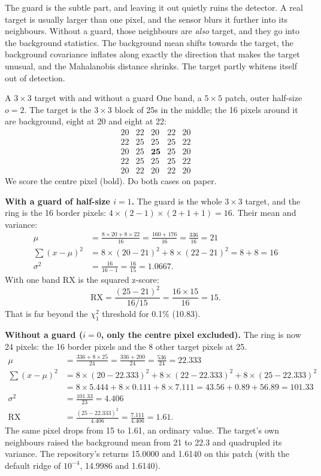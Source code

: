The guard is the subtle part, and leaving it out quietly ruins the detector. A real target is usually
larger than one pixel, and the sensor blurs it further into its neighbours. Without a guard, those
neighbours are \emph{also} target, and they go into the background statistics. The background mean
shifts towards the target, the background covariance inflates along exactly the direction that makes
the target unusual, and the Mahalanobis distance shrinks. The target partly whitens itself out of
detection.

\begin{worked}[label={we:localrx:guard}]{A $3\times3$ target with and without a guard}
One band, a $5\times5$ patch, outer half-size $o = 2$. The target is the $3\times3$ block of 25s in the
middle; the 16 pixels around it are background, eight at 20 and eight at 22:
\[
\begin{matrix}
20 & 22 & 20 & 22 & 20\\
22 & 25 & 25 & 25 & 22\\
20 & 25 & \mathbf{25} & 25 & 20\\
22 & 25 & 25 & 25 & 22\\
20 & 22 & 20 & 22 & 20
\end{matrix}
\]
We score the centre pixel (bold). Do both cases on paper.

\textbf{With a guard of half-size $i = 1$.} The guard is the whole $3\times3$ target, and the ring is
the 16 border pixels: $4\times(2 - 1)\times(2 + 1 + 1) = 16$. Their mean and variance:
\begin{align*}
\mu &= \frac{8\times20 + 8\times22}{16} = \frac{160 + 176}{16} = \frac{336}{16} = 21\\
\textstyle\sum(x - \mu)^2 &= 8\times(20 - 21)^2 + 8\times(22 - 21)^2 = 8 + 8 = 16\\
\sigma^2 &= \frac{16}{16 - 1} = \frac{16}{15} = 1.0667 .
\end{align*}
With one band RX is the squared z-score:
\[
\text{RX} = \frac{(25 - 21)^2}{16/15} = \frac{16\times15}{16} = 15 .
\]
That is far beyond the $\chi^2_1$ threshold for 0.1\% (10.83).

\textbf{Without a guard ($i = 0$, only the centre pixel excluded).} The ring is now 24 pixels: the 16
border pixels and the 8 other target pixels at 25.
\begin{align*}
\mu &= \frac{336 + 8\times25}{24} = \frac{336 + 200}{24} = \frac{536}{24} = 22.333\\
\textstyle\sum(x - \mu)^2 &= 8\times(20 - 22.333)^2 + 8\times(22 - 22.333)^2 + 8\times(25 - 22.333)^2\\
&= 8\times5.444 + 8\times0.111 + 8\times7.111 = 43.56 + 0.89 + 56.89 = 101.33\\
\sigma^2 &= \frac{101.33}{23} = 4.406\\
\text{RX} &= \frac{(25 - 22.333)^2}{4.406} = \frac{7.111}{4.406} = 1.61 .
\end{align*}
The same pixel drops from 15 to 1.61, an ordinary value. The target's own neighbours raised the
background mean from 21 to 22.3 and quadrupled its variance. The repository's
 returns 15.0000 and 1.6140 on this patch\tagC{} (with the default ridge of
$10^{-4}$, 14.9986 and 1.6140).
\end{worked}

